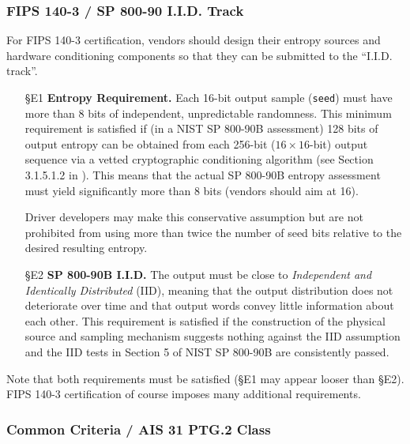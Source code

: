     \subsubsection{FIPS 140-3 / SP 800-90 I.I.D. Track}

    For FIPS 140-3 certification, vendors should design their entropy sources
    and hardware conditioning components so that they can be submitted to
    the  ``I.I.D. track''.

    \begin{itemize}

    \item[\S E1]    {\bf Entropy Requirement.}
    Each 16-bit output sample (\verb|seed|) must have more than 8 bits of
    independent, unpredictable randomness. This minimum requirement is
    satisfied if (in a NIST SP 800-90B \cite{TuBaKe+18} assessment) 128
    bits of output entropy can be obtained from each 256-bit
    ($16 \times 16$-bit)  output sequence via a vetted
    cryptographic conditioning algorithm (see Section 3.1.5.1.2 in
    \cite{TuBaKe+18}). This means that the actual SP 800-90B entropy
    assessment must yield significantly more than 8 bits (vendors should
    aim at 16).

    Driver developers may make this conservative assumption but are not
    prohibited from using more than twice the number of seed bits relative
    to the desired resulting entropy.

    \item[\S E2]    {\bf SP 800-90B I.I.D.}
    The output must be close to \emph{Independent and Identically Distributed}
    (IID), meaning that the output distribution does not deteriorate over
    time and that output words convey little information about each other.
    This requirement is satisfied if the construction of the physical source
    and sampling mechanism suggests nothing against the IID assumption
    and the IID tests in Section 5 of NIST SP 800-90B \cite{TuBaKe+18} are
    consistently passed.

    \end{itemize}

    Note that both requirements must be satisfied (\S E1 may appear looser
    than \S E2). FIPS 140-3 certification of course imposes many additional
    requirements.


    \subsubsection{Common Criteria / AIS 31 PTG.2 Class}

